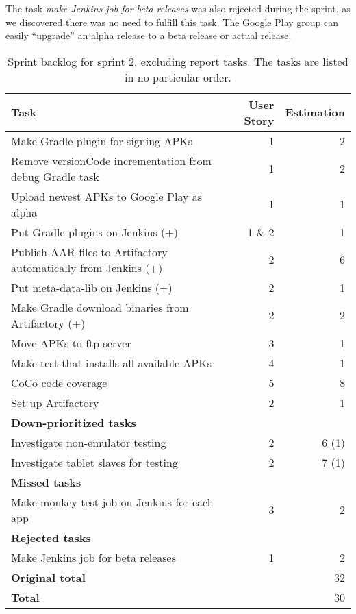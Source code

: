The task \emph{make Jenkins job for beta releases} was also rejected during the sprint, as we discovered there was no need to fulfill this task. The Google Play group can easily ``upgrade'' an alpha release to a beta release or actual release.

\begin{table}%
  \centering
  \begin{tabular}{p{}rr}
    \toprule
    \textbf{Task} & \textbf{User Story} & \textbf{Estimation} \\
    \midrule
    Make Gradle plugin for signing APKs                            & 1      & 2 \\
    Remove versionCode incrementation from debug Gradle task       & 1      & 2 \\
    Upload newest APKs to Google Play as alpha                     & 1      & 1 \\
    Put Gradle plugins on Jenkins (+)                              & 1 \& 2 & 1 \\
    Publish AAR files to Artifactory automatically from Jenkins (+)& 2      & 6 \\
    Put meta-data-lib on Jenkins (+)                               & 2      & 1 \\
    Make Gradle download binaries from Artifactory (+)             & 2      & 2 \\
    Move APKs to ftp server                                        & 3      & 1 \\
    Make test that installs all available APKs                     & 4      & 1 \\
    CoCo code coverage                                             & 5      & 8 \\
    Set up Artifactory                                             & 2      & 1 \\
    \midrule
    \textbf{Down-prioritized tasks} & & \\
    \midrule
    Investigate non-emulator testing                               & 2      & 6 (1) \\
    Investigate tablet slaves for testing                          & 2      & 7 (1) \\
    \midrule
    \textbf{Missed tasks} & & \\
    \midrule
    Make monkey test job on Jenkins for each app                   & 3      & 2 \\
    \midrule
    \textbf{Rejected tasks} & & \\
    \midrule
    Make Jenkins job for beta releases                             & 1      & 2 \\
    \midrule
    \textbf{Original total} & & 32 \\
    \textbf{Total} & & 30 \\
    \bottomrule
  \end{tabular}
\caption[Sprint 2 backlog]{Sprint backlog for sprint 2, excluding report tasks. The tasks are listed in no particular order.}
\label{tab:sprint2_tasks}
\end{table}